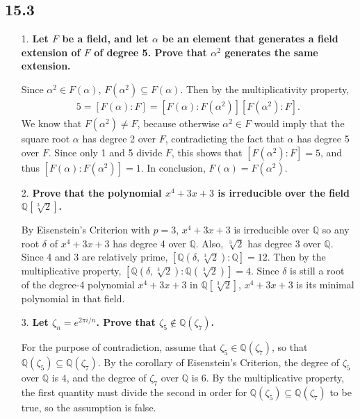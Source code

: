 \documentclass[a4paper,12pt]{article}
\begin{document}
\subsection*{15.3}
\begin{enumerate}
    \item[1.]
        \boldmath
        \textbf{Let $F$ be a field, and let $\alpha$ be an element that generates a field extension of $F$ of degree 5. Prove that $\alpha^2$ generates the same extension.} \par
        \unboldmath
        Since $\alpha^2 \in F(\alpha)$, $F(\alpha^2) \subseteq F(\alpha)$. Then by the multiplicativity property,
        \begin{align*}
            5 = [F(\alpha) : F] = [F(\alpha) : F(\alpha^2)] [F(\alpha^2) : F].
        \end{align*}
        We know that $F(\alpha^2) \neq F$, because otherwise $\alpha^2 \in F$ would imply that the square root $\alpha$ has degree 2 over $F$, contradicting the fact that $\alpha$ has degree 5 over $F$. Since only 1 and 5 divide $F$, this shows that $[F(\alpha^2) : F] = 5$, and thus $[F(\alpha) : F(\alpha^2)] = 1$. In conclusion, $F(\alpha) = F(\alpha^2)$.

    \item[2.]
        \boldmath
        \textbf{Prove that the polynomial $x^4 + 3x + 3$ is irreducible over the field $\mathbb{Q}[\sqrt[3]2]$.} \par
        \unboldmath
        By Eisenstein's Criterion with $p = 3$, $x^4 + 3x + 3$ is irreducible over $\mathbb{Q}$ so any root $\delta$ of $x^4 + 3x + 3$ has degree 4 over $\mathbb{Q}$. Also, $\sqrt[3]2$ has degree 3 over $\mathbb{Q}$. Since 4 and 3 are relatively prime, $[\mathbb{Q}(\delta, \sqrt[3]2) : \mathbb{Q}] = 12$. Then by the multiplicative property, $[\mathbb{Q}(\delta, \sqrt[3]2) : \mathbb{Q}(\sqrt[3]2)] = 4$. Since $\delta$ is still a root of the degree-4 polynomial $x^4 + 3x + 3$ in $\mathbb{Q}[\sqrt[3]2]$, $x^4 + 3x + 3$ is its minimal polynomial in that field.

    \item[3.]
        \boldmath
        \textbf{Let $\zeta_n = e^{2\pi i/n}$. Prove that $\zeta_5 \notin \mathbb{Q}(\zeta_7)$.} \par
        \unboldmath
        For the purpose of contradiction, assume that $\zeta_5 \in \mathbb{Q}(\zeta_7)$, so that $\mathbb{Q}(\zeta_5) \subseteq \mathbb{Q}(\zeta_7)$. By the corollary of Eisenstein's Criterion, the degree of $\zeta_5$ over $\mathbb{Q}$ is $4$, and the degree of $\zeta_7$ over $\mathbb{Q}$ is $6$. By the multiplicative property, the first quantity must divide the second in order for $\mathbb{Q}(\zeta_5) \subseteq \mathbb{Q}(\zeta_7)$ to be true, so the assumption is false.


\end{enumerate}
\end{document}
